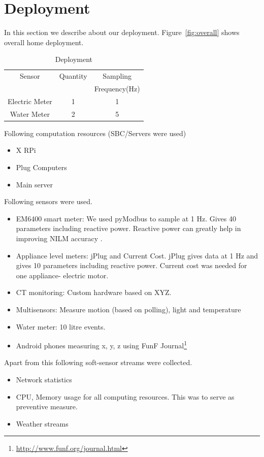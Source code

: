 \documentclass[10pt]{sensys-proc}
\newcommand{\figref}[1]{Figure~\ref{#1}}
\begin{document}
\section{Deployment}
In this section we describe about our deployment. \figref{fig:overall} shows overall home deployment.
\begin{table}
\caption{Deployment}

\label{tab:deployment}
\begin{tabular}{|c|c|c|}
\hline
Sensor&Quantity&Sampling\\
&&Frequency(Hz)\\
\hline

Electric Meter&1&1\\
Water Meter&2&5\\
\hline

\end{tabular}


\end{table}
Following computation resources (SBC/Servers were used)
\begin{itemize}
\item X RPi
\item Plug Computers
\item Main server
\end{itemize}
Following sensors were used.
\begin{itemize}
\item EM6400 smart meter: We used pyModbus to sample at 1 Hz. Gives 40 parameters including reactive power. Reactive power can greatly help in improving NILM accuracy \cite{hart}. 
\item Appliance level meters: jPlug and Current Cost. jPlug gives data at 1 Hz and gives 10 parameters including reactive power. Current cost was needed for one appliance- electric motor.
\item CT monitoring: Custom hardware based on  XYZ.
\item Multisensors: Measure motion (based on polling), light and temperature
\item Water meter: 10 litre events. 
\item Android phones measuring x, y, z using FunF Journal\footnote{\url{http://www.funf.org/journal.html}}
\end{itemize}
Apart from this following soft-sensor streams were collected.
\begin{itemize}
\item Network statistics
\item CPU, Memory usage for all computing resources. This was to serve as preventive measure.
\item Weather streams
\end{itemize}
\end{document}
